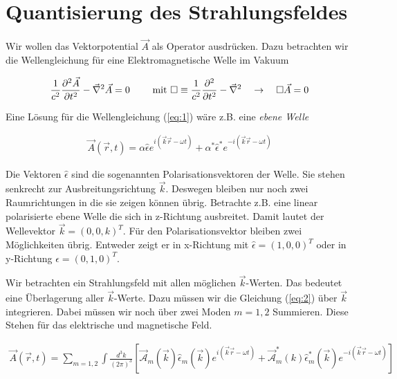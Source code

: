 
\usepackage{amsmath}                %
\usepackage{amsfonts}




\section*{Quantisierung des Strahlungsfeldes}

Wir wollen das Vektorpotential \(\vec A\) als Operator ausdrücken. Dazu betrachten wir die Wellengleichung für eine Elektromagnetische Welle im Vakuum

\begin{align}
  \label{eq:1}
  \frac{1}{c^2}\pdiff^2{\vec A}_t - \vec \nabla^2\vec A = 0 \qquad \text{ mit }\square\equiv\frac{1}{c^2}\pdiff^2_t - \vec \nabla^2\quad\to\quad\square\vec A = 0
\end{align}

Eine Lösung für die Wellengleichung (\ref{eq:1}) wäre z.B. eine \textit{ebene Welle}

\begin{align}
  \label{eq:2}
  \vec A(\vec r, t) = \alpha\hat \epsilon e^{i(\vec k\vec r -\omega t)} + \alpha^*\hat \epsilon^* e^{-i(\vec k\vec r-\omega t)} 
\end{align}

Die Vektoren \(\hat \epsilon\) sind die sogenannten Polarisationsvektoren der Welle. Sie stehen senkrecht zur Ausbreitungsrichtung \(\vec k\). Deswegen bleiben nur noch zwei Raumrichtungen in die sie zeigen können übrig. Betrachte z.B. eine linear polarisierte ebene Welle die sich in z-Richtung ausbreitet. Damit lautet der Wellevektor \(\vec k = (0,0,k)^T\). Für den Polarisationsvektor bleiben zwei Möglichkeiten übrig. Entweder zeigt er in x-Richtung mit \(\hat \epsilon=(1,0,0)^T\) oder in y-Richtung \(\hat \epsilon=(0,1,0)^T\).

Wir betrachten ein Strahlungsfeld mit allen möglichen \(\vec k\)-Werten. Das bedeutet eine Überlagerung aller \(\vec k\)-Werte. Dazu müssen wir die Gleichung (\ref{eq:2}) über \(\vec k\) integrieren. Dabei müssen wir noch über zwei Moden \(m=1,2\) Summieren. Diese Stehen für das elektrische und magnetische Feld.

\begin{align}
  \label{eq:3}
\vec A(\vec r, t) =\sum_{m=1,2}\int\frac{d^3k}{(2\pi)^3} \left[  \vec{\mathcal A}_m (\vec k) \hat \epsilon_m (\vec k) e^{i(\vec k\vec r-\omega t)} + \vec{\mathcal A}^*_m (k)\hat\epsilon^*_m(\vec k) e^{-i(\vec k\vec r-\omega t)}\right]
\end{align}

